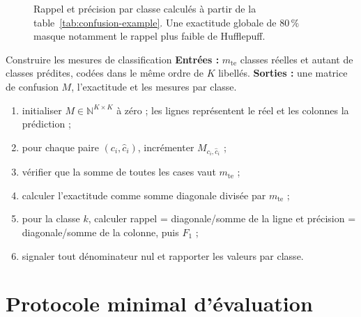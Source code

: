 \begin{figure}[htbp]
\centering
{}
\caption{Rappel et précision par classe calculés à partir de la
table~\ref{tab:confusion-example}. Une exactitude globale de $80\,\%$ masque
notamment le rappel plus faible de Hufflepuff.}
\label{fig:metrics-comparison}
\end{figure}

\begin{procedure}{Construire les mesures de classification}
\textbf{Entrées :} $m_{\mathrm{te}}$ classes réelles et autant de classes
prédites, codées dans le même ordre de $K$ libellés. \textbf{Sorties :} une
matrice de confusion $M$, l'exactitude et les mesures par classe.
\begin{enumerate}
  \item initialiser $M\in\mathbb{N}^{K\times K}$ à zéro ; les lignes représentent le
        réel et les colonnes la prédiction ;
  \item pour chaque paire $(c_i,\widehat c_i)$, incrémenter $M_{c_i,\widehat c_i}$ ;
  \item vérifier que la somme de toutes les cases vaut $m_{\mathrm{te}}$ ;
  \item calculer l'exactitude comme somme diagonale divisée par $m_{\mathrm{te}}$ ;
  \item pour la classe $k$, calculer rappel = diagonale/somme de la ligne et
        précision = diagonale/somme de la colonne, puis $F_1$ ;
  \item signaler tout dénominateur nul et rapporter les valeurs par classe.
\end{enumerate}
\end{procedure}

\section{Protocole minimal d'évaluation}

